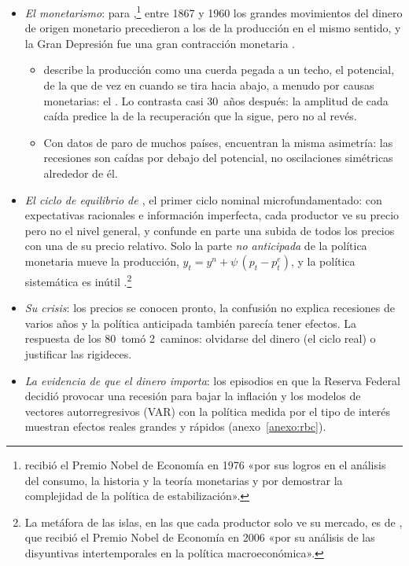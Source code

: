 \documentclass[11pt]{article}
\begin{document}
\begin{itemize}
\item \emph{El monetarismo}: para \textcite{FriedmanSchwartz1963Monetary},\footnote{ recibió el Premio Nobel de Economía en 1976 «por sus logros en el análisis del consumo, la historia y la teoría monetarias y por demostrar la complejidad de la política de estabilización»\nocite{Nobel1976Friedman}.} entre 1867 y 1960 los grandes movimientos del dinero de origen monetario precedieron a los de la producción en el mismo sentido, y la Gran Depresión fue una gran contracción monetaria .
  \begin{itemize}
  \item \textcite{Friedman1964Monetary} describe la producción como una cuerda pegada a un techo, el potencial, de la que de vez en cuando se tira hacia abajo, a menudo por causas monetarias: el . Lo contrasta casi 30~años después\nocite{Friedman1993Plucking}: la amplitud de cada caída predice la de la recuperación que la sigue, pero no al revés.
  \item Con datos de paro de muchos países, \textcite{DuprazNakamuraSteinsson2025} encuentran la misma asimetría: las recesiones son caídas por debajo del potencial, no oscilaciones simétricas alrededor de él.
  \end{itemize}
\item \emph{El ciclo de equilibrio de \textcite{Lucas1972Expectations}}, el primer ciclo nominal microfundamentado: con expectativas racionales e información imperfecta, cada productor ve su precio pero no el nivel general, y confunde en parte una subida de todos los precios con una de su precio relativo. Solo la parte \emph{no anticipada} de la política monetaria mueve la producción, $y_t=y^n+\psi\,(p_t-p^e_t)$, y la política sistemática es inútil .\footnote{La metáfora de las islas, en las que cada productor solo ve su mercado, es de \textcite{Phelps1970Microeconomic}, que recibió el Premio Nobel de Economía en 2006 «por su análisis de las disyuntivas intertemporales en la política macroeconómica»\nocite{Nobel2006Phelps}.}
\item \emph{Su crisis}: los precios se conocen pronto, la confusión no explica recesiones de varios años y la política anticipada también parecía tener efectos. La respuesta de los 80~tomó 2~caminos: olvidarse del dinero (el ciclo real) o justificar las rigideces.
\item \emph{La evidencia de que el dinero importa}: los episodios en que la Reserva Federal decidió provocar una recesión para bajar la inflación\nocite{RomerRomer1989Does} y los modelos de vectores autorregresivos (VAR) con la política medida por el tipo de interés\nocite{Sims1992Interpreting,ChristianoEichenbaumEvans1996Effects} muestran efectos reales grandes y rápidos (anexo~\ref{anexo:rbc}).

\end{itemize}
\end{document}
